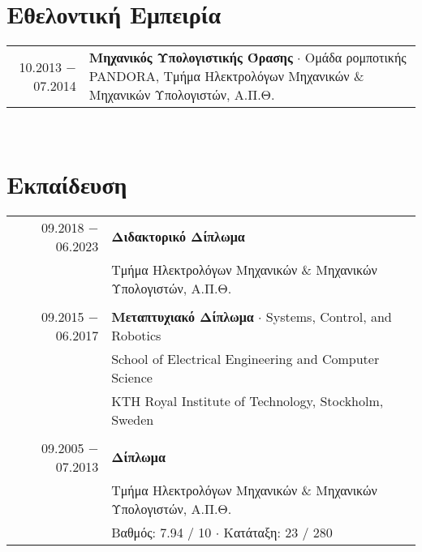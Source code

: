 \documentclass[a4paper,10pt,twoside]{article}
\begin{document}

\section{Εθελοντική Εμπειρία}

\begin{tabular}{rp{12cm}}
10.2013 $-$ 07.2014 & \textbf{Μηχανικός Υπολογιστικής Όρασης} $\cdot$ Ομάδα ρομποτικής PANDORA, Τμήμα Ηλεκτρολόγων Μηχανικών \& Μηχανικών Υπολογιστών, Α.Π.Θ.\\
\end{tabular} \\



\section{Εκπαίδευση}

\begin{tabular}{rp{11cm}}
09.2018 $-$ 06.2023 & \textbf{Διδακτορικό Δίπλωμα} \\
                    & Τμήμα Ηλεκτρολόγων Μηχανικών \& Μηχανικών Υπολογιστών, Α.Π.Θ.\\
&\\
09.2015 $-$ 06.2017 & \textbf{Μεταπτυχιακό Δίπλωμα} $\cdot$ Systems, Control, and Robotics\\
                    & School of Electrical Engineering and Computer Science \\
                    & KTH Royal Institute of Technology, Stockholm, Sweden\\
&\\
09.2005 $-$ 07.2013 & \textbf{Δίπλωμα} \\
                    & Τμήμα Ηλεκτρολόγων Μηχανικών \& Μηχανικών Υπολογιστών, Α.Π.Θ.\\
                    & {\small Βαθμός: 7.94 / 10 $\cdot$ Κατάταξη: 23 / 280}
\end{tabular}\\


\end{document}
